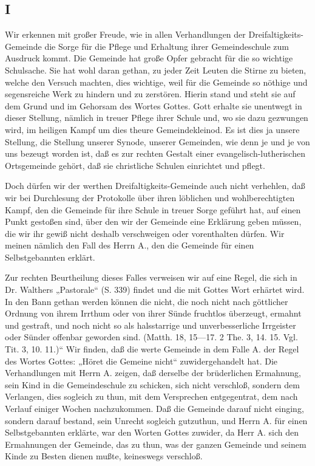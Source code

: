 \subsection{I}

Wir erkennen mit großer Freude, wie in allen Verhandlungen der Dreifaltigkeits-Gemeinde die Sorge für die Pflege und Erhaltung ihrer Gemeindeschule zum Ausdruck kommt. Die Gemeinde hat große Opfer gebracht für die so wichtige Schulsache. Sie hat wohl daran gethan, zu jeder Zeit Leuten die Stirne zu bieten, welche den Versuch machten, dies wichtige, weil für die Gemeinde so nöthige und segensreiche Werk zu hindern und zu zerstören. Hierin stand und steht sie auf dem Grund und im Gehorsam des Wortes Gottes. Gott erhalte sie unentwegt in dieser Stellung, nämlich in treuer Pflege ihrer Schule und, wo sie dazu gezwungen wird, im heiligen Kampf um dies theure Gemeindekleinod. Es ist dies ja unsere Stellung, die Stellung unserer Synode, unserer Gemeinden, wie denn je und je von uns bezeugt worden ist, daß es zur rechten Gestalt einer evangelisch-lutherischen Ortsgemeinde gehört, daß sie christliche Schulen einrichtet und pflegt.

Doch dürfen wir der werthen Dreifaltigkeits-Gemeinde auch nicht verhehlen, daß wir bei Durchlesung der Protokolle über ihren löblichen und wohlberechtigten Kampf, den die Gemeinde für ihre Schule in treuer Sorge geführt hat, auf einen Punkt gestoßen sind, über den wir der Gemeinde eine Erklärung geben müssen, die wir ihr gewiß nicht deshalb verschweigen oder vorenthalten dürfen. Wir meinen nämlich den Fall des Herrn A., den die Gemeinde für einen Selbstgebannten erklärt.

Zur rechten Beurtheilung dieses Falles verweisen wir auf eine Regel, die sich in Dr. Walthers „Pastorale“ (S. 339) findet und die mit Gottes Wort erhärtet wird. In den Bann gethan werden können die nicht, die noch nicht nach göttlicher Ordnung von ihrem Irrthum oder von ihrer Sünde fruchtlos überzeugt, ermahnt und gestraft, und noch nicht so als halsstarrige und unverbesserliche Irrgeister oder Sünder offenbar geworden sind. (Matth. 18, 15—17. 2 The. 3, 14. 15. Vgl. Tit. 3, 10. 11.)“ Wir finden, daß die werte Gemeinde in dem Falle A. der Regel des Wortes Gottes: „Höret die Gemeine nicht“ zuwidergehandelt hat. Die Verhandlungen mit Herrn A. zeigen, daß derselbe der brüderlichen Ermahnung, sein Kind in die Gemeindeschule zu schicken, sich nicht verschloß, sondern dem Verlangen, dies sogleich zu thun, mit dem Versprechen entgegentrat, dem nach Verlauf einiger Wochen nachzukommen. Daß die Gemeinde darauf nicht einging, sondern darauf bestand, sein Unrecht sogleich gutzuthun, und Herrn A. für einen Selbstgebannten erklärte, war den Worten Gottes zuwider, da Herr A. sich den Ermahnungen der Gemeinde, das zu thun, was der ganzen Gemeinde und seinem Kinde zu Besten dienen mußte, keineswegs verschloß.

